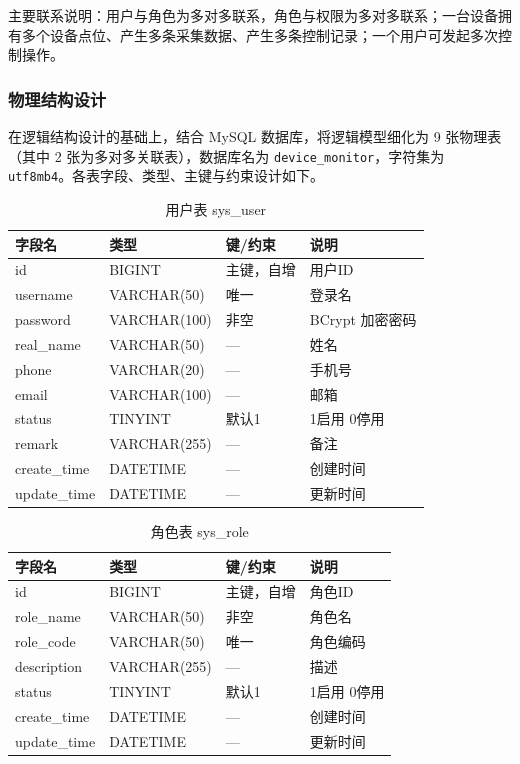 \documentclass[12pt,hyperref,a4paper,UTF8]{ctexart}
\begin{document}
主要联系说明：用户与角色为多对多联系，角色与权限为多对多联系；一台设备拥有多个设备点位、产生多条采集数据、产生多条控制记录；一个用户可发起多次控制操作。

\subsubsection{物理结构设计}

在逻辑结构设计的基础上，结合 MySQL 数据库，将逻辑模型细化为 9 张物理表（其中 2 张为多对多关联表），数据库名为 \texttt{device\_monitor}，字符集为 \texttt{utf8mb4}。各表字段、类型、主键与约束设计如下。

\begin{table}[!htbp]
    \centering
    \caption{用户表 sys\_user}
    \begin{tabularx}{0.90\textwidth}{@{}L{3.0cm} L{3.2cm} L{2.5cm} Y@{}}
    \toprule
    \textbf{字段名} & \textbf{类型} & \textbf{键/约束} & \textbf{说明} \\
    \midrule
    id & BIGINT & 主键，自增 & 用户ID \\
    username & VARCHAR(50) & 唯一 & 登录名 \\
    password & VARCHAR(100) & 非空 & BCrypt 加密密码 \\
    real\_name & VARCHAR(50) & — & 姓名 \\
    phone & VARCHAR(20) & — & 手机号 \\
    email & VARCHAR(100) & — & 邮箱 \\
    status & TINYINT & 默认1 & 1启用 0停用 \\
    remark & VARCHAR(255) & — & 备注 \\
    create\_time & DATETIME & — & 创建时间 \\
    update\_time & DATETIME & — & 更新时间 \\
    \bottomrule
    \end{tabularx}
\end{table}

\begin{table}[!htbp]
    \centering
    \caption{角色表 sys\_role}
    \begin{tabularx}{0.90\textwidth}{@{}L{3.0cm} L{3.2cm} L{2.5cm} Y@{}}
    \toprule
    \textbf{字段名} & \textbf{类型} & \textbf{键/约束} & \textbf{说明} \\
    \midrule
    id & BIGINT & 主键，自增 & 角色ID \\
    role\_name & VARCHAR(50) & 非空 & 角色名 \\
    role\_code & VARCHAR(50) & 唯一 & 角色编码 \\
    description & VARCHAR(255) & — & 描述 \\
    status & TINYINT & 默认1 & 1启用 0停用 \\
    create\_time & DATETIME & — & 创建时间 \\
    update\_time & DATETIME & — & 更新时间 \\
    \bottomrule
    \end{tabularx}
\end{table}
\end{document}

